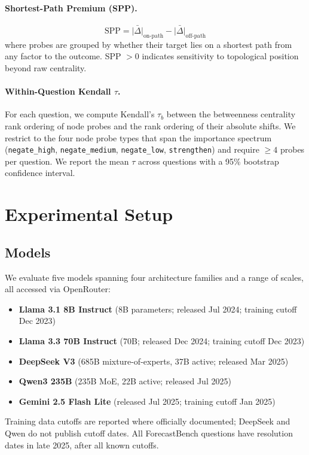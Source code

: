 \documentclass[11pt]{article}
\begin{document}
\paragraph{Shortest-Path Premium (SPP).}
\begin{equation}
    \text{SPP} = \bar{|\Delta|}_{\text{on-path}} - \bar{|\Delta|}_{\text{off-path}}
\end{equation}
where probes are grouped by whether their target lies on a shortest path from any factor to the outcome. SPP $> 0$ indicates sensitivity to topological position beyond raw centrality.

\paragraph{Within-Question Kendall $\tau$.}
For each question, we compute Kendall's $\tau_b$ between the betweenness centrality rank ordering of node probes and the rank ordering of their absolute shifts. We restrict to the four node probe types that span the importance spectrum (\texttt{negate\_high}, \texttt{negate\_medium}, \texttt{negate\_low}, \texttt{strengthen}) and require $\geq 4$ probes per question. We report the mean $\tau$ across questions with a 95\% bootstrap confidence interval.

\section{Experimental Setup}
\label{sec:setup}

\subsection{Models}

We evaluate five models spanning four architecture families and a range of scales, all accessed via OpenRouter:
\begin{itemize}
    \item \textbf{Llama 3.1 8B Instruct} (8B parameters; released Jul 2024; training cutoff Dec 2023)
    \item \textbf{Llama 3.3 70B Instruct} (70B; released Dec 2024; training cutoff Dec 2023)
    \item \textbf{DeepSeek V3} (685B mixture-of-experts, 37B active; released Mar 2025)
    \item \textbf{Qwen3 235B} (235B MoE, 22B active; released Jul 2025)
    \item \textbf{Gemini 2.5 Flash Lite} (released Jul 2025; training cutoff Jan 2025)
\end{itemize}
Training data cutoffs are reported where officially documented; DeepSeek and Qwen do not publish cutoff dates. All ForecastBench questions have resolution dates in late 2025, after all known cutoffs.
\end{document}
